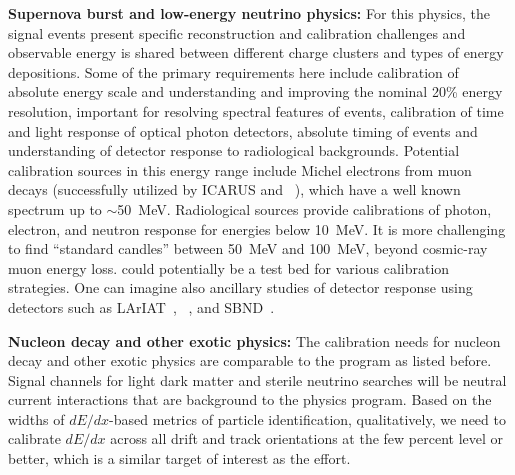 \textbf{Supernova burst and low-energy neutrino physics:} For this physics, the signal events present specific reconstruction and calibration challenges and observable energy is shared between different charge clusters and types of energy depositions. Some of the primary requirements here include calibration of absolute energy scale and 
understanding and improving the nominal 20\% energy resolution, important for resolving spectral features of  events,
calibration of time and light response of optical photon detectors, absolute timing of events and understanding of detector response to radiological backgrounds. Potential calibration sources in this energy range include Michel electrons from muon decays (successfully utilized by ICARUS and ~\cite{Acciarri:2017sjy}), which have a well known spectrum up to $\sim$50~MeV. Radiological sources provide calibrations of photon, electron, and neutron response for energies below \SI{10}{\MeV}. It is more challenging to find ``standard candles'' between 50~MeV and \SI{100}{\MeV}, beyond cosmic-ray muon energy loss.  could potentially be a test bed for various calibration strategies. One can imagine also ancillary studies of detector response using detectors such as LArIAT~\cite{Cavanna:2014iqa}, ~\cite{Acciarri:2016smi}, and SBND~\cite{Antonello:2015lea}. %

\textbf{Nucleon decay and other exotic physics:} The calibration needs for nucleon decay and other exotic physics are comparable to the  program as listed before. Signal channels for light dark matter and sterile neutrino searches will be neutral current interactions that are background to the  physics program. %
Based on the widths of $dE/dx$-based metrics of particle identification, qualitatively, we need to calibrate $dE/dx$ across all drift and track orientations at the few percent level or better, which is a similar target of interest as the  effort.

